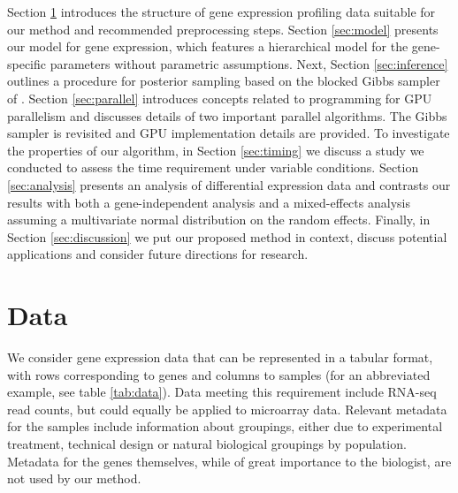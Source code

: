 Section \ref{sec:data} introduces the structure of gene expression profiling data suitable for our method and recommended preprocessing steps. Section \ref{sec:model} presents our model for gene expression, which features a hierarchical model for the gene-specific parameters without parametric assumptions. Next, Section \ref{sec:inference} outlines a procedure for posterior sampling based on the blocked Gibbs sampler of \cite{ishwaran2000}. Section \ref{sec:parallel} introduces concepts related to programming for GPU parallelism and discusses details of two important parallel algorithms. The Gibbs sampler is revisited and GPU implementation details are provided. To investigate the properties of our algorithm, in Section \ref{sec:timing} we discuss a study we conducted to assess the time requirement under variable conditions. Section \ref{sec:analysis} presents an analysis of differential expression data and contrasts our results with both a gene-independent analysis and a mixed-effects analysis assuming a multivariate normal distribution on the random effects. Finally, in Section \ref{sec:discussion} we put our proposed method in context, discuss potential applications and consider future directions for research.
\section{Data}
\label{sec:data}
We consider gene expression data that can be represented in a tabular format, with rows corresponding to genes and columns to samples (for an abbreviated example, see table \ref{tab:data}). Data meeting this requirement include RNA-seq read counts, but could equally be applied to microarray data. Relevant metadata for the samples include information about groupings, either due to experimental treatment, technical design or natural biological groupings by population. Metadata for the genes themselves, while of great importance to the biologist, are not used by our method.

